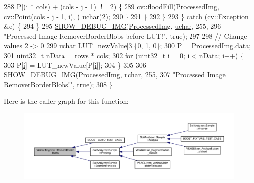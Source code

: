 \begin{DoxyCode}
288             P[(\hyperlink{_comparision_pictures_2_createtest_image_8m_a6f6ccfcf58b31cb6412107d9d5281426}{i} * cols) + (cols - \hyperlink{_comparision_pictures_2_createtest_image_8m_ac86694252f8dfdb19aaeadc4b7c342c6}{j} - 1)] != 2) \{
289           cv::floodFill(\hyperlink{class_vision_1_1_image_processing_aa7d65742882cd1b2a1e4e9cb68809211}{ProcessedImg}, cv::Point(cols - \hyperlink{_comparision_pictures_2_createtest_image_8m_ac86694252f8dfdb19aaeadc4b7c342c6}{j} - 1, \hyperlink{_comparision_pictures_2_createtest_image_8m_a6f6ccfcf58b31cb6412107d9d5281426}{i}), (
      \hyperlink{_soil_math_types_8h_a65f85814a8290f9797005d3b28e7e5fc}{uchar})2);
290         \}
291       \}
292     \}
293   \} \textcolor{keywordflow}{catch} (cv::Exception &e) \{
294   \}
295   \hyperlink{_vision_debug_8h_aae864fa4f990213a4184a209ff236202}{SHOW\_DEBUG\_IMG}(\hyperlink{class_vision_1_1_image_processing_aa7d65742882cd1b2a1e4e9cb68809211}{ProcessedImg}, \hyperlink{_soil_math_types_8h_a65f85814a8290f9797005d3b28e7e5fc}{uchar}, 255,
296                  \textcolor{stringliteral}{"Processed Image RemoverBorderBlobs before LUT!"}, \textcolor{keyword}{true});
297 
298   \textcolor{comment}{// Change values 2 -> 0}
299   \hyperlink{_soil_math_types_8h_a65f85814a8290f9797005d3b28e7e5fc}{uchar} LUT\_newValue[3]\{0, 1, 0\};
300   P = \hyperlink{class_vision_1_1_image_processing_aa7d65742882cd1b2a1e4e9cb68809211}{ProcessedImg}.data;
301   uint32\_t nData = rows * cols;
302   \textcolor{keywordflow}{for} (uint32\_t \hyperlink{_comparision_pictures_2_createtest_image_8m_a6f6ccfcf58b31cb6412107d9d5281426}{i} = 0; \hyperlink{_comparision_pictures_2_createtest_image_8m_a6f6ccfcf58b31cb6412107d9d5281426}{i} < nData; \hyperlink{_comparision_pictures_2_createtest_image_8m_a6f6ccfcf58b31cb6412107d9d5281426}{i}++) \{
303     P[\hyperlink{_comparision_pictures_2_createtest_image_8m_a6f6ccfcf58b31cb6412107d9d5281426}{i}] = LUT\_newValue[P[\hyperlink{_comparision_pictures_2_createtest_image_8m_a6f6ccfcf58b31cb6412107d9d5281426}{i}]];
304   \}
305 
306   \hyperlink{_vision_debug_8h_aae864fa4f990213a4184a209ff236202}{SHOW\_DEBUG\_IMG}(\hyperlink{class_vision_1_1_image_processing_aa7d65742882cd1b2a1e4e9cb68809211}{ProcessedImg}, \hyperlink{_soil_math_types_8h_a65f85814a8290f9797005d3b28e7e5fc}{uchar}, 255,
307                  \textcolor{stringliteral}{"Processed Image RemoverBorderBlobs!"}, \textcolor{keyword}{true});
308 \}
\end{DoxyCode}


Here is the caller graph for this function\+:\nopagebreak
\begin{figure}[H]
\begin{center}
\leavevmode
\includegraphics[width=350pt]{class_vision_1_1_segment_a65a50340b5a1a0fb08a1b5749b7145b6_icgraph}
\end{center}
\end{figure}


